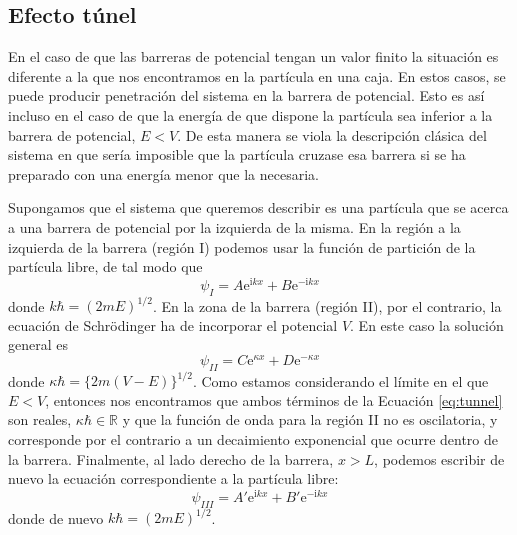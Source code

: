 \subsection{Efecto túnel}
En el caso de que las barreras de potencial tengan un 
valor finito la situación es diferente a la que nos
encontramos en la partícula en una caja. En estos casos,
se puede producir penetración del sistema en la barrera 
de potencial. Esto es así incluso en el caso de que la
energía de que dispone la partícula sea inferior a la
barrera de potencial, $E<V$. De esta manera se viola la
descripción clásica del sistema en que sería imposible
que la partícula cruzase esa barrera si se ha preparado
con una energía menor que la necesaria.

Supongamos que el sistema que queremos describir es una 
partícula que se acerca a una barrera de potencial por la 
izquierda de la misma. En la región a la izquierda de la 
barrera (región I) podemos usar la función de partición de 
la partícula libre, de tal modo que
\begin{equation}
    \psi_I=A\mathrm{e}^{\mathrm{i}kx} +
    B\mathrm{e}^{-\mathrm{i}kx}
    \label{eq:tunnelfree}
\end{equation}
donde $k\hbar=(2mE)^{1/2}$. En la zona de la barrera
(región II), por el contrario, la ecuación de Schrödinger 
ha de  incorporar el potencial $V$. En este caso la solución
general es
\begin{equation}
    \psi_{II}=C\mathrm{e}^{\kappa x} + D\mathrm{e}^{-\kappa x}
\label{eq:tunnel}
\end{equation}
donde $\kappa\hbar=\{2m(V-E)\}^{1/2}$. Como estamos
considerando el límite en el que $E<V$, entonces nos encontramos que ambos términos de la Ecuación 
\ref{eq:tunnel} son reales, $\kappa\hbar\in \mathbb{R}$ y
que la función de onda para la región II no es oscilatoria,
y corresponde por el contrario a un decaimiento exponencial
que ocurre dentro de la barrera.
Finalmente, al lado derecho de la barrera, $x>L$, podemos escribir de nuevo la ecuación 
correspondiente a la partícula libre:
\begin{equation}
    \psi_{III}=A'\mathrm{e}^{\mathrm{i}kx} + B'\mathrm{e}^{-\mathrm{i}kx}
\end{equation}
donde de nuevo $k\hbar=(2mE)^{1/2}$.


